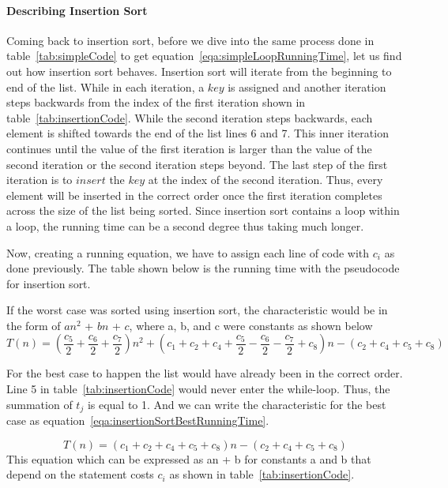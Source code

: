 \documentclass[12pt]{article}
\begin{document}
	\paragraph{Describing Insertion Sort}
	Coming back to insertion sort, before we dive into the same process done in table~\ref{tab:simpleCode} to get equation~\ref{eqa:simpleLoopRunningTime}, let us find out how insertion sort behaves.
	Insertion sort will iterate from the beginning to end of the list.
	While in each iteration, a $key$ is assigned and another iteration steps backwards from the index of the first iteration shown in table~\ref{tab:insertionCode}.
	While the second iteration steps backwards, each element is shifted towards the end of the list lines 6 and 7.
	This inner iteration continues until the value of the first iteration is larger than the value of the second iteration or the second iteration steps beyond.
	The last step of the first iteration is to $\textit{insert}$ the $key$ at the index of the second iteration.
	Thus, every element will be inserted in the correct order once the first iteration completes across the size of the list being sorted.
	Since insertion sort contains a loop within a loop, the running time can be a second degree thus taking much longer.
	
	Now, creating a running equation, we have to assign each line of code with $c_i$ as done previously.
	The table shown below is the running time with the pseudocode for insertion sort.
	
	
	
	If the worst case was sorted using insertion sort, the characteristic would be in the form of $an^2$ + $bn$ + $c$, where a, b, and c were constants as shown below
	\begin{equation}
	T(n) = (\frac{c_5}{2} + \frac{c_6}{2} + \frac{c_7}{2})n^2 + (c_1 + c_2 + c_4 + \frac{c_5}{2} - \frac{c_6}{2} - \frac{c_7}{2} + c_8)n - (c_2 + c_4 + c_5 + c_8)
	\label{eqa:insertionSortWorstRunningTime}
	\end{equation}
	
	For the best case to happen the list would have already been in the correct order.
	Line 5 in table~\ref{tab:insertionCode} would never enter the while-loop.
	Thus, the summation of $t_j$ is equal to 1.
	And we can write the characteristic for the best case as equation~\ref{eqa:insertionSortBestRunningTime}.
	
	\begin{equation}
	T(n) = (c_1 + c_2 + c_4 + c_5 + c_8)n - (c_2 + c_4 + c_5 + c_8)
	\label{eqa:insertionSortBestRunningTime}
	\end{equation}
	This equation which can be expressed as an + b for constants a and b that depend on the statement costs $c_i$ as shown in table~\ref{tab:insertionCode}.
	
\end{document}
